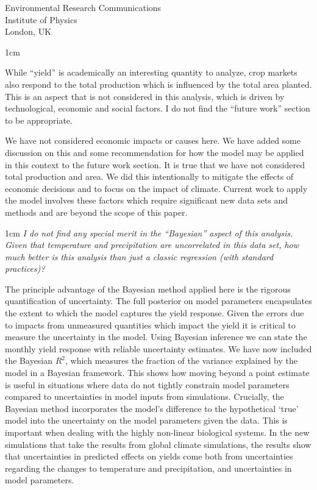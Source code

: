 \documentclass{letter}
\newcommand{\review}[1]{   
    \begin{adjustwidth}{1cm}{}
    \em{#1}
    \end{adjustwidth}
    }
\begin{document}
\begin{letter}{Environmental Research Communications \\ Institute of Physics \\ London, UK}
\review{

While “yield” is academically an interesting quantity to analyze, crop markets also respond to the total production which is influenced by the total area planted. This is an aspect that is not considered in this analysis, which is driven by technological, economic and social factors. I do not find the “future work” section to be appropriate.
}

We have not considered economic impacts or causes here. We have added some discussion on this and some recommendation for how the model may be applied in this context to the future work section. It is true that we have not considered total production and area. We did this intentionally to mitigate the effects of economic decisions and to focus on the impact of climate. Current work to apply the model involves these factors which require significant new data sets and methods and are beyond the scope of this paper.

\review{
I do not find any special merit in the ``Bayesian'' aspect of this analysis. Given that temperature and precipitation are uncorrelated in this data set, how much better is this analysis than just a classic regression (with standard practices)?
}

The principle advantage of the Bayesian method applied here is the rigorous quantification of uncertainty. The full posterior on model parameters encapsulates the extent to which the model captures the yield response. Given the errors due to impacts from unmeasured quantities which impact the yield it is critical to measure the uncertainty in the model. Using Bayesian inference we can state the monthly yield response with reliable uncertainty estimates. We have now included the Bayesian $R^2$, which measures the fraction of the variance explained by the model in a Bayesian framework. This shows how moving beyond a point estimate is useful in situations where data do not tightly constrain model parameters compared to uncertainties in model inputs from simulations. Crucially, the Bayesian method incorporates the model's difference to the hypothetical `true' model into the uncertainty on the model parameters given the data. This is important when dealing with the highly non-linear biological systems. In the new simulations that take the results from global climate simulations, the results show that uncertainties in predicted effects on yields come both from uncertainties regarding the changes to temperature and precipitation, and uncertainties in model parameters.


\end{letter}
\end{document}
